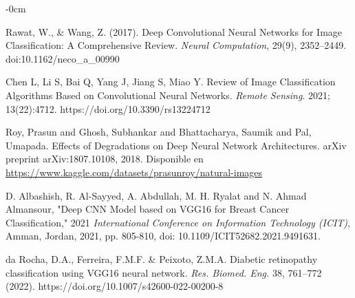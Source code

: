 \documentclass[journal,article,submit,pdftex,moreauthors]{Definitions/mdpi}
\begin{document}
\begin{adjustwidth}{-\extralength}{0cm}



%

\begin{thebibliography}{999}

Rawat, W., \& Wang, Z. (2017). Deep Convolutional Neural Networks for Image Classification: A Comprehensive Review. \textit{Neural Computation}, 29(9), 2352–2449. doi:10.1162/neco\_a\_00990 

Chen L, Li S, Bai Q, Yang J, Jiang S, Miao Y. Review of Image Classification Algorithms Based on Convolutional Neural Networks. \textit{Remote Sensing}. 2021; 13(22):4712. https://doi.org/10.3390/rs13224712

Roy, Prasun and Ghosh, Subhankar and Bhattacharya, Saumik and Pal, Umapada. Effects of Degradations on Deep Neural Network Architectures. arXiv preprint arXiv:1807.10108, 2018. Disponible en \href{https://www.kaggle.com/datasets/prasunroy/natural-images}{https://www.kaggle.com/datasets/prasunroy/natural-images}


D. Albashish, R. Al-Sayyed, A. Abdullah, M. H. Ryalat and N. Ahmad Almansour, "Deep CNN Model based on VGG16 for Breast Cancer Classification," 2021 \textit{International Conference on Information Technology (ICIT)}, Amman, Jordan, 2021, pp. 805-810, doi: 10.1109/ICIT52682.2021.9491631.

da Rocha, D.A., Ferreira, F.M.F. \& Peixoto, Z.M.A. Diabetic retinopathy classification using VGG16 neural network. \textit{Res. Biomed. Eng.} 38, 761–772 (2022). https://doi.org/10.1007/s42600-022-00200-8


\end{thebibliography}
\end{adjustwidth}
\end{document}
